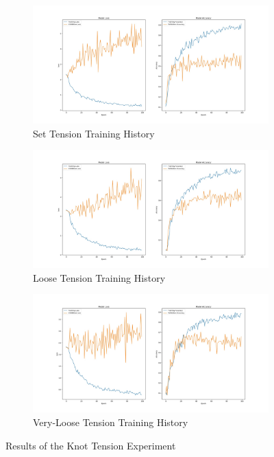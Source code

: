 \documentclass{l4proj}
\begin{document}
\begin{figure}[h]
	\begin{subfigure}{\textwidth}
		\centering
        \includegraphics[width=.8\linewidth]{eval/setTensionResult}
        \caption{Set Tension Training History}
        \label{fig:SetTensionExperiment}
	\end{subfigure}
	\begin{subfigure}{\textwidth}
		\centering
        \includegraphics[width=.8\linewidth]{eval/looseTensionResult}
        \caption{Loose Tension Training History}
        \label{fig:LooseTensionExperiment}
	\end{subfigure}
	\begin{subfigure}{\textwidth}
		\centering
        \includegraphics[width=.8\linewidth]{eval/veryLooseTensionResult}
        \caption{Very-Loose Tension Training History}
        \label{fig:VeryLooseExperiment}
	\end{subfigure}
	\caption{Results of the Knot Tension Experiment}
    \label{fig:KnotTensionResults}
\end{figure}
\end{document}
